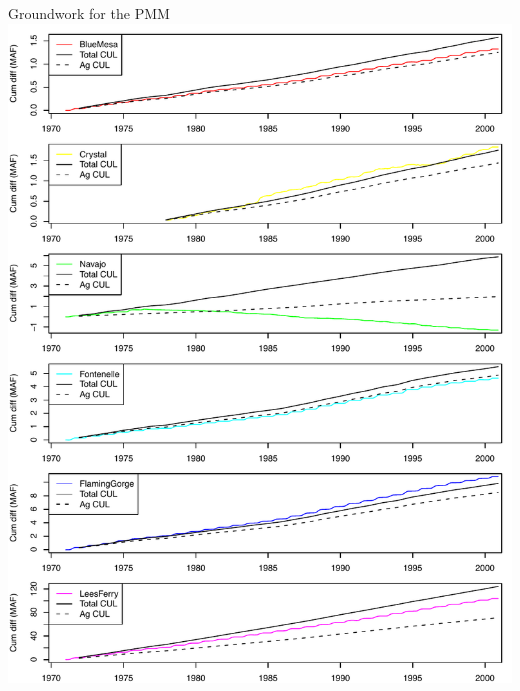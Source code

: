 \documentclass[compress]{beamer}
\begin{document}
\begin{frame}{Groundwork for the PMM}
\includegraphics[width=\textwidth]{figs/cum-diff.pdf} 
\end{frame}

\end{document}
